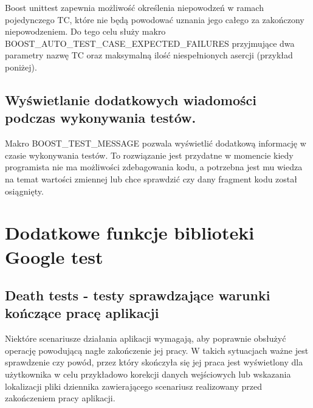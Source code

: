 \documentclass[12pt,a4paper,notitlepage]{report}
\begin{document}
Boost unittest zapewnia możliwość określenia niepowodzeń w ramach pojedynczego TC, które nie będą powodować uznania jego całego za zakończony niepowodzeniem. Do tego celu służy makro BOOST{\_}AUTO{\_}TEST{\_}CASE{\_}EXPECTED{\_}FAILURES przyjmujące dwa parametry nazwę TC oraz maksymalną ilość niespełnionych asercji (przykład poniżej).

			

\section{Wyświetlanie dodatkowych wiadomości podczas wykonywania testów.}

Makro BOOST{\_}TEST{\_}MESSAGE pozwala wyświetlić dodatkową informację w czasie wykonywania testów. To rozwiązanie jest przydatne w momencie kiedy programista nie ma możliwości zdebagowania kodu, a potrzebna jest mu wiedza na temat wartości zmiennej lub chce sprawdzić czy dany fragment kodu został osiągnięty.

			

\chapter{Dodatkowe funkcje biblioteki Google test}

\section{Death tests - testy sprawdzające warunki kończące pracę aplikacji}

Niektóre scenariusze działania aplikacji wymagają, aby poprawnie obsłużyć operację powodującą nagłe zakończenie jej pracy. W takich sytuacjach ważne jest sprawdzenie czy powód, przez który skończyła się jej praca jest wyświetlony dla użytkownika w celu przykładowo korekcji danych wejściowych lub wskazania lokalizacji pliki dziennika zawierającego scenariusz realizowany przed zakończeniem pracy aplikacji.
\end{document}
